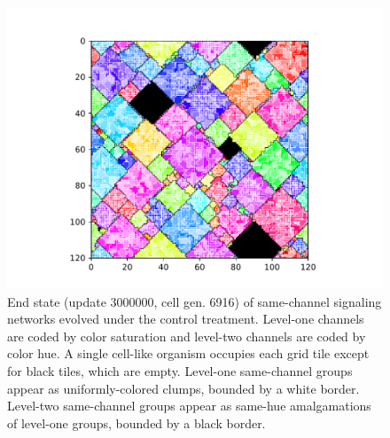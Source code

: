 \begin{figure}%
\begin{center}

\includegraphics[width=\columnwidth,trim={2.5cm 0.5cm 2.5cm 1cm},clip]{img/ChannelMap_1018_update3000000}

\caption{
End state (update 3000000, cell gen. 6916) of same-channel signaling networks evolved under the control treatment.
Level-one channels are coded by color saturation and level-two channels are coded by color hue.
A single cell-like organism occupies each grid tile except for black tiles, which are empty.
Level-one same-channel groups appear as uniformly-colored clumps, bounded by a white border.
Level-two same-channel groups appear as same-hue amalgamations of level-one groups, bounded by a black border.
}
\label{fig:outcome_control}
\end{center}
\end{figure}
